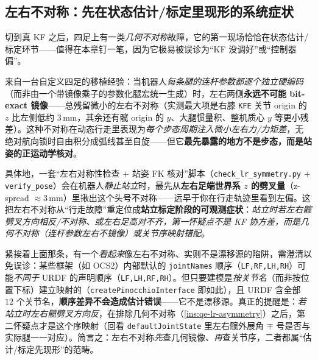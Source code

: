 \subsection{左右不对称：先在状态估计/标定里现形的系统症状}
\label{subsec:qe-lr-asymmetry}

切到真 KF 之后，四足上有一类\emph{几何不对称}故障，它的第一现场恰恰在状态估计/标定环节——值得在本章钉一笔，因为它极易被误诊为“KF 没调好”或“控制器偏”。

\begin{insight}\label{ins:qe-lr-asymmetry}
来自一台自定义四足的移植经验：当机器人\emph{每条腿的连杆参数都逐个独立硬编码}（而非由一个带镜像乘子的参数化腿宏统一生成）时，左右两侧\textbf{永远不可能 bit-exact 镜像}——总残留微小的左右不对称（实测最大项是右膝 \texttt{KFE} 关节 origin 的 $z$ 比左侧低约 $3\,\mathrm{mm}$，其余还有髋 origin 的 $y$、大腿惯量积、整机质心 $y$ 等更小残差）。这种不对称在动态行走里表现为\emph{每个步态周期注入微小左右力/力矩差}，无绝对航向锁时自由积分成弧线甚至自旋——但它\textbf{最先暴露的地方不是步态，而是站姿的正运动学核对}。

具体地，一套“左右对称性检查 $+$ 站姿 FK 核对”脚本（\texttt{check\_lr\_symmetry.\allowbreak py} $+$ \texttt{verify\_pose}）会在机器人\emph{静止站立}时，最先从\textbf{左右足端世界系 $z$ 的劈叉量}（z-spread $\approx3\,\mathrm{mm}$）里揪出这个头号不对称——远早于你在行走轨迹里看到左偏。这把左右不对称从“行走故障”重定位成\textbf{站立标定阶段的可观测症状}：\emph{站立时若左右髋劈叉方向相反/不对称、或左右足高对不齐，第一怀疑点不是 KF 协方差，而是几何不对称（连杆参数左右不镜像）或关节序映射错配}。
\end{insight}

\begin{note}\label{note:qe-jointorder}
紧挨着上面那条，有一个\emph{看起来}像左右不对称、实则不是漂移源的陷阱，需澄清以免误诊：某些框架（如 OCS2）内部默认的 \texttt{jointNames} 顺序（\texttt{LF,RF,LH,RH}）可能\emph{不同于} URDF 的声明顺序（\texttt{LF,LH,RF,RH}）。但只要建模是\emph{按关节名}（而非按位置下标）建立映射的（\texttt{createPinocchioInterface} 即如此），且 URDF 含全部 $12$ 个关节名，\textbf{顺序差异不会造成估计错误}——它不是漂移源。真正的提醒是：\emph{若站立时左右髋劈叉方向反}，在排除几何不对称（\cref{ins:qe-lr-asymmetry}）之后，第二怀疑点才是这个序映射（回看 \texttt{defaultJointState} 里左右髋外展角 $\mp$ 号是否与实际腿一一对应）。简言之：左右不对称\emph{先}查几何镜像、\emph{再}查关节序，二者都属“估计/标定先现形”的范畴。
\end{note}

